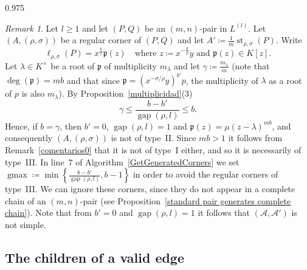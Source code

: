 \documentclass[reqno,a4paper,twoside]{amsart}
\theoremstyle{definition}
\theoremstyle{remark}
\newtheorem{remark}[theorem]{Remark}
\DeclareMathOperator{\gap}{gap}
\DeclareMathOperator{\st}{st}
\DeclareMathOperator{\Pred}{Pred}
\DeclareMathOperator{\gmax}{gmax}
\begin{document}
\begin{spacing}{0.975}
\begin{remark}\label{comentarios}
Let $l\ge 1$ and let $(P,Q)$ be an $(m,n)$-pair in $L^{(l)}$. Let $(A,(\rho,\sigma))$ be a regular corner  of $(P,Q)$ and let $A'\coloneqq \frac{1}{m}\st_{\rho,\sigma}(P)$. Write
$$
\ell_{\rho,\sigma}(P) = x^{\frac{k}{l}} \mathfrak{p}(z)\quad\text{where $z\coloneqq x^{-\frac{\sigma}{\rho}}y$ and $\mathfrak{p}(z)\in K[z]$.}
$$
Let $\lambda\in K^{\times}$ be a root of $\mathfrak{p}$ of multiplicity $m_{\lambda}$ and let $\gamma\coloneqq \frac{m_{\lambda}}{m}$ (note that $\deg(\mathfrak{p}) = mb$ and that since $\mathfrak{p} = (x^{-\sigma/\rho}y)^{b'} p$, the multiplicity of $\lambda$ as a root of $p$ is also $m_{\lambda}$). By Proposition~\ref{multiplicidad}(3)
$$
\gamma\le \frac{b-b'}{\gap(\rho,l)} \le b.
$$
Hence, if $b = \gamma$, then $b'=0$, $\gap(\rho,l) = 1$ and $\mathfrak{p}(z) = \mu(z-\lambda)^{mb}$, and consequently $(A,(\rho,\sigma))$ is not of type~II. Since $mb>1$ it follows from Remark~\ref{comentarios0} that it is not of type~I either, and so it is necessarily of type~III. In line~7 of Algorithm~\ref{GetGeneratedCorners} we set $\gmax\coloneqq \min\left\{\frac{b-b'}{\gap(\rho,l)},b-1\right\}$ in order to avoid the regular corners of type~III. We can ignore these corners, since they do not appear in a complete chain of an $(m,n)$-pair (see Proposition~\ref{standard pair generates complete chain}). Note that from $b'=0$ and $\gap(\rho,l) = 1$ it follows that $(\mathcal{A},\mathcal{A}')$ is not simple.
\end{remark}

\subsection{The children of a valid edge}\label{the children}



\end{spacing}
\end{document}

